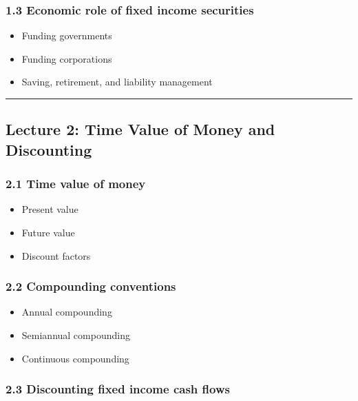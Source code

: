 \documentclass[
  letterpaper,
  DIV=11,
  numbers=noendperiod]{scrartcl}
\providecommand{\tightlist}{%
  \setlength{\itemsep}{0pt}\setlength{\parskip}{0pt}}
\begin{document}
\subsubsection{1.3 Economic role of fixed income
securities}\label{economic-role-of-fixed-income-securities}

\begin{itemize}
\tightlist
\item
  Funding governments
\item
  Funding corporations
\item
  Saving, retirement, and liability management
\end{itemize}

\begin{center}\rule{0.5\linewidth}{0.5pt}\end{center}

\subsection{Lecture 2: Time Value of Money and
Discounting}\label{lecture-2-time-value-of-money-and-discounting}

\subsubsection{2.1 Time value of money}\label{time-value-of-money}

\begin{itemize}
\tightlist
\item
  Present value
\item
  Future value
\item
  Discount factors
\end{itemize}

\subsubsection{2.2 Compounding
conventions}\label{compounding-conventions}

\begin{itemize}
\tightlist
\item
  Annual compounding
\item
  Semiannual compounding
\item
  Continuous compounding
\end{itemize}

\subsubsection{2.3 Discounting fixed income cash
flows}\label{discounting-fixed-income-cash-flows}
\end{document}
